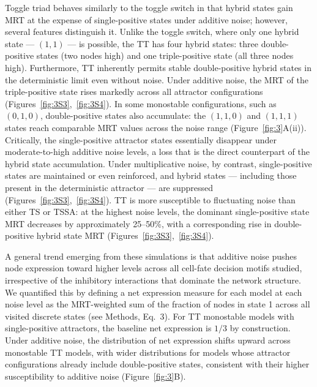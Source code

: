 \documentclass[11pt]{article}
\begin{document}
Toggle triad behaves similarly to the toggle switch in that hybrid states gain MRT at the expense of single-positive states under additive noise; however, several features distinguish it. Unlike the toggle switch, where only one hybrid state --- $(1,1)$ --- is possible, the TT has four hybrid states: three double-positive states (two nodes high) and one triple-positive state (all three nodes high). Furthermore, TT inherently permits stable double-positive hybrid states in the deterministic limit even without noise. Under additive noise, the MRT of the triple-positive state rises markedly across all attractor configurations (Figures~\ref{fig:3S3},~\ref{fig:3S4}). In some monostable configurations, such as $(0,1,0)$, double-positive states also accumulate: the $(1,1,0)$ and $(1,1,1)$ states reach comparable MRT values across the noise range (Figure~\ref{fig:3}A(ii)). Critically, the single-positive attractor states essentially disappear under moderate-to-high additive noise levels, a loss that is the direct counterpart of the hybrid state accumulation. Under multiplicative noise, by contrast, single-positive states are maintained or even reinforced, and hybrid states --- including those present in the deterministic attractor --- are suppressed (Figures~\ref{fig:3S3},~\ref{fig:3S4}). TT is more susceptible to fluctuating noise than either TS or TSSA: at the highest noise levels, the dominant single-positive state MRT decreases by approximately 25--50\%, with a corresponding rise in double-positive hybrid state MRT (Figures~\ref{fig:3S3},~\ref{fig:3S4}).

A general trend emerging from these simulations is that additive noise pushes node expression toward higher levels across all cell-fate decision motifs studied, irrespective of the inhibitory interactions that dominate the network structure. We quantified this by defining a net expression measure for each model at each noise level as the MRT-weighted sum of the fraction of nodes in state 1 across all visited discrete states (see Methods, Eq.~3). For TT monostable models with single-positive attractors, the baseline net expression is $1/3$ by construction. Under additive noise, the distribution of net expression shifts upward across monostable TT models, with wider distributions for models whose attractor configurations already include double-positive states, consistent with their higher susceptibility to additive noise (Figure~\ref{fig:3}B).
\end{document}
